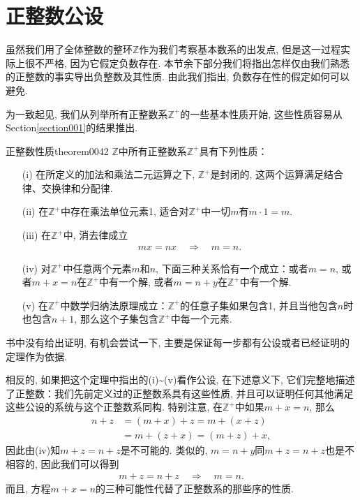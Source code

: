 \section{正整数公设}\label{subsection00205}
虽然我们用了全体整数的整环$\mathbb{Z}$作为我们考察基本数系的出发点, 但是这一过程实际上很不严格, 因为它假定负数存在. 本节余下部分我们将指出怎样仅由我们熟悉的正整数的事实导出负整数及其性质. 由此我们指出, 负数存在性的假定如何可以避免. 

为一致起见, 我们从列举所有正整数系$\mathbb{Z}^+$的一些基本性质开始, 这些性质容易从Section\ref{section001}的结果推出. 
\begin{theorem}{正整数性质}{theorem0042}
$\mathbb{Z}$中所有正整数系$\mathbb{Z}^+$具有下列性质：
\begin{enumerate}
\item[(i)] 在所定义的加法和乘法二元运算之下, $\mathbb{Z}^+$是封闭的, 这两个运算满足结合律、交换律和分配律. 
\item[(ii)] 在$\mathbb{Z}^+$中存在乘法单位元素1, 适合对$\mathbb{Z}^+$中一切$m$有$m \cdot 1 = m$. 
\item[(iii)] 在$\mathbb{Z}^+$中, 消去律成立
\begin{gather}\label{equation0040}
mx=nx\quad\Rightarrow\quad m=n.
\end{gather}
\item[(iv)] 对$\mathbb{Z}^+$中任意两个元素$m$和$n$, 下面三种关系恰有一个成立：或者$m=n$, 或者$m+x=n$在$\mathbb{Z}^+$中有一个解, 或者$m=n+y$在$\mathbb{Z}^+$中有一个解. 
\item[(v)] 在$\mathbb{Z}^+$中数学归纳法原理成立：$\mathbb{Z}^+$的任意子集如果包含1, 并且当他包含$n$时也包含$n+1$, 那么这个子集包含$\mathbb{Z}^+$中每一个元素. 
\end{enumerate}
\end{theorem}

书中没有给出证明, 有机会尝试一下, 主要是保证每一步都有公设或者已经证明的定理作为依据. 

相反的, 如果把这个定理中指出的(i)\textasciitilde(v)看作公设, 在下述意义下, 它们完整地描述了正整数：我们先前定义过的正整数系具有这些性质, 并且可以证明任何其他满足这些公设的系统与这个正整数系同构. 特别注意, 在$\mathbb{Z}^+$中如果$m+x=n$, 那么
\[
\begin{aligned}
n+z &= (m+x)+z = m+(x+z)\\
&=m+(z+x) = (m+z)+x,
\end{aligned}
\]
因此由(iv)知$m+z=n+z$是不可能的. 类似的, $m=n+y$同$m+z=n+z$也是不相容的, 因此我们可以得到
\begin{gather}\label{equation0041}
m+z=n+z \quad \Rightarrow\quad m=n.
\end{gather}
而且, 方程$m+x=n$的三种可能性代替了正整数系的那些序的性质. 

